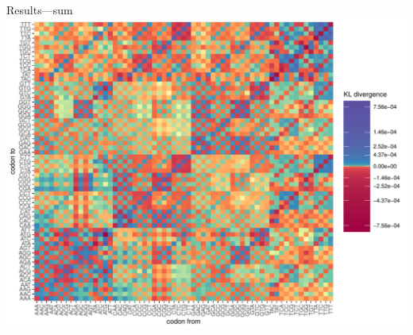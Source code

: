 \documentclass[aspectratio=169,font=14pt]{beamer}
\begin{document}
\begin{frame}{Results---sum} %
\centering
\includegraphics[height = 0.9\textheight]{chapter3/figures/heatmaps/tri-sum-mg-1.pdf}
\end{frame} %
\end{document}

